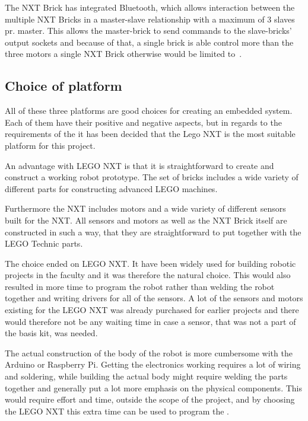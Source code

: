 The NXT Brick has integrated Bluetooth, which allows interaction between the multiple NXT Bricks in a master-slave relationship with a maximum of 3 slaves pr. master. This allows the master-brick to send commands to the slave-bricks' output sockets and because of that, a single brick is able control more than the three motors a single NXT Brick otherwise would be limited to~\citep{lego_edu_guide}.

\subsection{Choice of platform}
All of these three platforms are good choices for creating an embedded system. Each of them have their positive and negative aspects, but in regards to the requirements of the \projname{} it has been decided that the Lego NXT is the most suitable platform for this project.

An advantage with LEGO NXT is that it is straightforward to create and construct a working robot prototype. The set of bricks includes a wide variety of different parts for constructing advanced LEGO machines. 

Furthermore the NXT includes motors and a wide variety of different sensors built for the NXT. All sensors and motors as well as the NXT Brick itself are constructed in such a way, that they are straightforward to put together with the LEGO Technic parts.

The choice ended on LEGO NXT. It have been widely used for building robotic projects in the faculty and it was therefore the natural choice. This would also resulted in more time to program the robot rather than welding the robot together and writing drivers for all of the sensors. A lot of the sensors and motors existing for the LEGO NXT was already purchased for earlier projects and there would therefore not be any waiting time in case a sensor, that was not a part of the basis kit, was needed.

The actual construction of the body of the robot is more cumbersome with the Arduino or Raspberry Pi. Getting the electronics working requires a lot of wiring and soldering, while building the actual body might require welding the parts together and generally put a lot more emphasis on the physical components. This would require effort and time, outside the scope of the project, and by choosing the LEGO NXT this extra time can be used to program the \projname{}.



